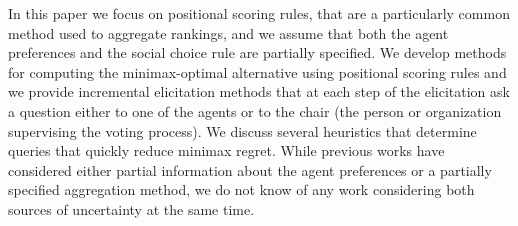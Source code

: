 \documentclass[sigconf, anonymous]{aamas}
\begin{document}
In this paper we focus on positional scoring rules, that are a particularly common method used to aggregate rankings, and we assume that both the agent preferences and the social choice rule are partially specified. We develop methods for computing the minimax-optimal
alternative using positional scoring rules and we provide incremental elicitation methods that 
at each step of the elicitation ask a question either to one of the agents or to the chair (the person or organization supervising the voting process).
We discuss several heuristics that determine queries that quickly reduce minimax regret. 
While previous works have considered either partial information about the agent preferences or a partially specified aggregation method, we do not know of any work considering both sources of uncertainty at the same time.

\end{document}
